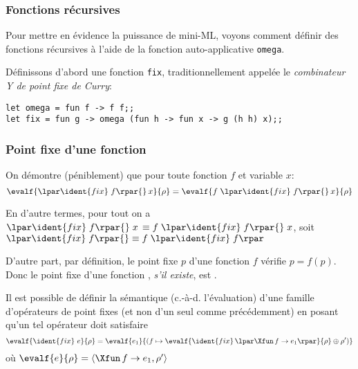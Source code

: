 % 
\begin{frame}[containsverbatim]
\frametitle{Fonctions récursives}

Pour mettre en évidence la puissance de mini-ML, voyons comment
définir des fonctions récursives à l'aide de la fonction
auto-applicative \texttt{\small omega}.

\bigskip

Définissons d'abord une fonction \texttt{\small fix},
traditionnellement appelée le \emph{combinateur Y de point fixe de
Curry}:
\begin{verbatim}
let omega = fun f -> f f;;
let fix = fun g -> omega (fun h -> fun x -> g (h h) x);;
\end{verbatim}

\end{frame}

% 
\begin{frame}
\frametitle{Point fixe d'une fonction}

On démontre (péniblement) que pour toute fonction $f$ et variable $x$:
$$\evalf{\lpar\ident{fix} \; f\rpar{} \, x}{\rho} = \evalf{f \;
  \lpar\ident{fix} \; f\rpar{} \, x}{\rho}$$

En d'autre termes, pour tout  on a $\lpar\ident{fix} \; f\rpar{}
\; x \, \equiv f \; \lpar\ident{fix} \; f\rpar{} \; x$, soit
$\lpar\ident{fix} \; f\rpar{} \equiv f \; \lpar\ident{fix} \; f\rpar$

\bigskip

D'autre part, par définition, le point fixe $p$ d'une fonction $f$
vérifie $p = f(p)$. Donc le point fixe d'une fonction ,
\emph{s'il existe}, est \lpar{} \rpar{}.

\bigskip

Il est possible de définir la sémantique (c.-à-d. l'évaluation) d'une
famille d'opérateurs de point fixes (et non d'un seul comme
précédemment) en posant qu'un tel opérateur doit satisfaire
$$\evalf{\ident{fix} \,\, e}{\rho} = \evalf{e_1}{(f \mapsto
  \evalf{\ident{fix} \, \lpar\Xfun \, f \rightarrow e_1\rpar}{\rho}
  \oplus \rho')}$$ où $\evalf{e}{\rho} = \langle\Xfun \, f \rightarrow
e_1,\rho'\rangle$

\end{frame}

